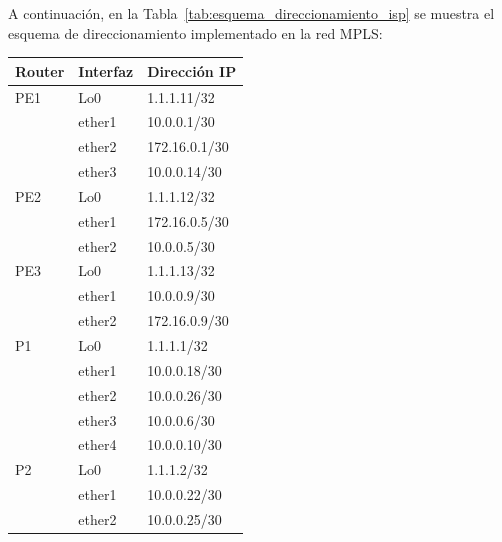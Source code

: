 \newpage

\noindent
A continuación, en la Tabla~\ref{tab:esquema_direccionamiento_isp} se muestra el esquema de direccionamiento implementado en la red MPLS:
\begin{table}[H]
	\centering
	\begin{subtable}[b]{0.475\textwidth}
		\centering
		\begin{tabular}{|l|l|l|}
			\hline
			\textbf{Router} & \textbf{Interfaz} & \textbf{Dirección IP} \\ \hline
			PE1             & Lo0               & 1.1.1.11/32           \\ \cline{2-3}
			                & ether1            & 10.0.0.1/30           \\ \cline{2-3}
			                & ether2            & 172.16.0.1/30         \\ \cline{2-3}
			                & ether3            & 10.0.0.14/30          \\ \hline
			PE2             & Lo0               & 1.1.1.12/32           \\ \cline{2-3}
			                & ether1            & 172.16.0.5/30         \\ \cline{2-3}
			                & ether2            & 10.0.0.5/30           \\ \hline
			PE3             & Lo0               & 1.1.1.13/32           \\ \cline{2-3}
			                & ether1            & 10.0.0.9/30           \\ \cline{2-3}
			                & ether2            & 172.16.0.9/30         \\ \hline
			P1              & Lo0               & 1.1.1.1/32            \\ \cline{2-3}
			                & ether1            & 10.0.0.18/30          \\ \cline{2-3}
			                & ether2            & 10.0.0.26/30          \\ \cline{2-3}
			                & ether3            & 10.0.0.6/30           \\ \cline{2-3}
			                & ether4            & 10.0.0.10/30          \\ \hline
			P2              & Lo0               & 1.1.1.2/32            \\ \cline{2-3}
			                & ether1            & 10.0.0.22/30          \\ \cline{2-3}
			                & ether2            & 10.0.0.25/30          \\ \hline

\end{tabular}
\end{subtable}
\end{table}
